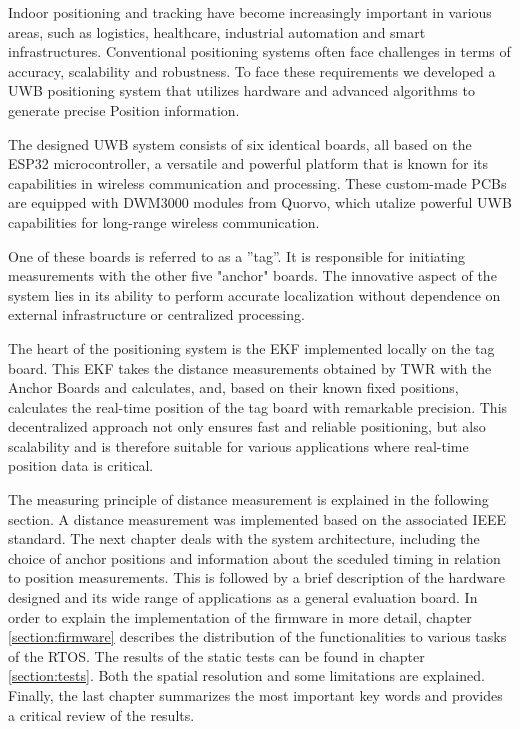 \documentclass[conference, a4paper]{IEEEtran}
\begin{document}
Indoor positioning and tracking have become increasingly important in various areas,
such as logistics, healthcare, industrial automation and smart infrastructures.
Conventional positioning systems often face challenges in terms of accuracy, scalability and robustness.
To face these requirements we developed a \ac{UWB} positioning system that utilizes
hardware and advanced algorithms to generate precise Position information.

The designed \ac{UWB} system consists of six identical boards,
all based on the ESP32 microcontroller, a versatile and powerful platform that is 
known for its capabilities in wireless communication and processing.
These custom-made \acp{PCB} are equipped with DWM3000 modules from Quorvo,
which utalize powerful UWB capabilities for long-range wireless communication.

One of these boards is referred to as a ''tag''.
It is responsible for initiating measurements with the other five "anchor" boards.
The innovative aspect of the system lies in its ability to perform accurate localization
without dependence on external infrastructure or centralized processing.

The heart of the positioning system is the \acf{EKF} implemented locally on the tag board.
This \ac{EKF} takes the distance measurements obtained by \acf{TWR} with the Anchor Boards and calculates,
and, based on their known fixed positions, calculates the real-time position of the tag board
with remarkable precision.
This decentralized approach not only ensures fast and reliable positioning, but also scalability and is therefore
suitable for various applications where real-time position data is critical.

The measuring principle of distance measurement is explained in the following section.
A distance measurement was implemented based on the associated IEEE standard.
The next chapter deals with the system architecture, including the choice of anchor positions and
information about the sceduled timing in relation to position measurements.
This is followed by a brief description of the hardware designed and
its wide range of applications as a general evaluation board.
In order to explain the implementation of the firmware in more detail,
chapter \ref{section:firmware} describes the distribution of the functionalities to various tasks of the \ac{RTOS}.
The results of the static tests can be found in chapter \ref{section:tests}.
Both the spatial resolution and some limitations are explained.
Finally, the last chapter summarizes the most important key words and provides a critical review of the results.
\end{document}
